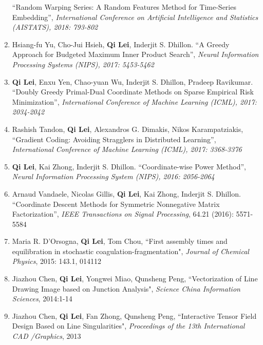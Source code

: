 \documentclass[margin, 10pt]{res} %
\begin{document}
\begin{resume}
\begin{enumerate}
{    ``Random Warping Series: A Random Features Method for Time-Series Embedding'', \textit{International Conference on Artificial Intelligence and Statistics (AISTATS), 2018: 793-802}}
\item{Hsiang-fu Yu, Cho-Jui Hsieh, \textbf{Qi Lei}, Inderjit S. Dhillon. 
      ``A Greedy Approach for Budgeted Maximum 
      Inner Product Search'', \textit{Neural Information Processing Systems 
      (NIPS), 2017: 5453-5462}}
    \item{\textbf{Qi Lei}, Enxu Yen, Chao-yuan Wu, Inderjit S. Dhillon, Pradeep 
        Ravikumar. ``Doubly Greedy Primal-Dual Coordinate Methods on Sparse Empirical 
  Risk Minimization'', \textit{International Conference of Machine 
    Learning (ICML), 2017: 2034-2042}}
\item{Rashish Tandon, \textbf{Qi Lei}, 
    Alexandros G. Dimakis, Nikos Karampatziakis, ``Gradient Coding: Avoiding 
    Stragglers in Distributed Learning'', \textit{International Conference of 
  Machine Learning (ICML), 2017: 3368-3376}}
  \item {\textbf{Qi Lei},
      Kai Zhong, Inderjit S. Dhillon. ``Coordinate-wise Power Method'', 
  \textit{Neural Information Processing System (NIPS), 2016: 2056-2064}}		

	\item {Arnaud Vandaele, Nicolas Gillis, \textbf{Qi Lei},
      Kai Zhong, Inderjit S. Dhillon. ``Coordinate Descent Methods for
		Symmetric Nonnegative Matrix Factorization'', \textit{IEEE Transactions on 
Signal Processing}, 64.21 (2016): 5571-5584}	

	\item {Maria R. D'Orsogna, \textbf{Qi Lei}, Tom Chou, ``First assembly times and equilibration in stochastic coagulation-fragmentation", \textit{Journal of Chemical Physics}, 2015: 143.1, 014112}
		\item {Jiazhou Chen, \textbf{Qi Lei}, Yongwei Miao, Qunsheng Peng, ``Vectorization of Line Drawing Image based on Junction Analysis", \textit{Science China Information Sciences}, 2014:1-14}
	\item {Jiazhou Chen, \textbf{Qi Lei}, Fan Zhong, Qunsheng Peng, ``Interactive Tensor Field Design Based on Line Singularities", \textit{Proceedings of the 13th International CAD /Graphics}, 2013}
\end{enumerate}




\end{resume}
\end{document}
